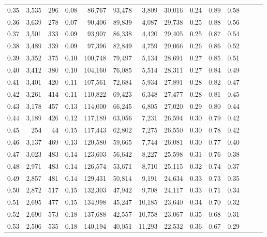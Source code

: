 \begin{tabular}{rrrrrrrrrrrrrr}
0.35 &  3,535 &  296 &  0.08 &   86,767 &   93,478 &   3,809 &  30,016 &  0.24 &  0.89 &      0.58 \\
0.36 &  3,639 &  278 &  0.07 &   90,406 &   89,839 &   4,087 &  29,738 &  0.25 &  0.88 &      0.56 \\
0.37 &  3,501 &  333 &  0.09 &   93,907 &   86,338 &   4,420 &  29,405 &  0.25 &  0.87 &      0.54 \\
0.38 &  3,489 &  339 &  0.09 &   97,396 &   82,849 &   4,759 &  29,066 &  0.26 &  0.86 &      0.52 \\
0.39 &  3,352 &  375 &  0.10 &  100,748 &   79,497 &   5,134 &  28,691 &  0.27 &  0.85 &      0.51 \\
0.40 &  3,412 &  380 &  0.10 &  104,160 &   76,085 &   5,514 &  28,311 &  0.27 &  0.84 &      0.49 \\
0.41 &  3,401 &  420 &  0.11 &  107,561 &   72,684 &   5,934 &  27,891 &  0.28 &  0.82 &      0.47 \\
0.42 &  3,261 &  414 &  0.11 &  110,822 &   69,423 &   6,348 &  27,477 &  0.28 &  0.81 &      0.45 \\
0.43 &  3,178 &  457 &  0.13 &  114,000 &   66,245 &   6,805 &  27,020 &  0.29 &  0.80 &      0.44 \\
0.44 &  3,189 &  426 &  0.12 &  117,189 &   63,056 &   7,231 &  26,594 &  0.30 &  0.79 &      0.42 \\
0.45 &    254 &   44 &  0.15 &  117,443 &   62,802 &   7,275 &  26,550 &  0.30 &  0.78 &      0.42 \\
0.46 &  3,137 &  469 &  0.13 &  120,580 &   59,665 &   7,744 &  26,081 &  0.30 &  0.77 &      0.40 \\
0.47 &  3,023 &  483 &  0.14 &  123,603 &   56,642 &   8,227 &  25,598 &  0.31 &  0.76 &      0.38 \\
0.48 &  2,971 &  483 &  0.14 &  126,574 &   53,671 &   8,710 &  25,115 &  0.32 &  0.74 &      0.37 \\
0.49 &  2,857 &  481 &  0.14 &  129,431 &   50,814 &   9,191 &  24,634 &  0.33 &  0.73 &      0.35 \\
0.50 &  2,872 &  517 &  0.15 &  132,303 &   47,942 &   9,708 &  24,117 &  0.33 &  0.71 &      0.34 \\
0.51 &  2,695 &  477 &  0.15 &  134,998 &   45,247 &  10,185 &  23,640 &  0.34 &  0.70 &      0.32 \\
0.52 &  2,690 &  573 &  0.18 &  137,688 &   42,557 &  10,758 &  23,067 &  0.35 &  0.68 &      0.31 \\
0.53 &  2,506 &  535 &  0.18 &  140,194 &   40,051 &  11,293 &  22,532 &  0.36 &  0.67 &      0.29 \\

\end{tabular}
